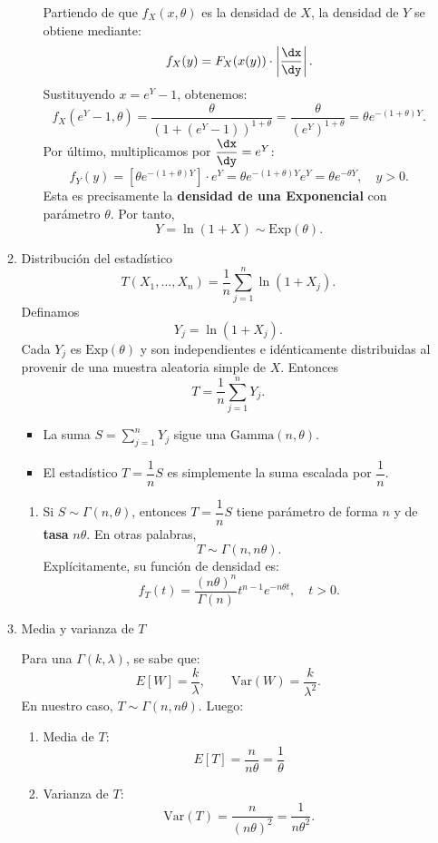 \begin{enumerate}[label=\color{red}\textbf{\arabic*)}]
\begin{enumerate}[label=\arabic*)]
\begin{enumerate}[label=\arabic*)]
        Partiendo de que $f_X(x,\theta)$ es la densidad de $X$, la densidad de  $Y$ se obtiene mediante: \[
        f_X(y)=F_X(x(y))\cdot \left| \dfrac{\dx }{\dy } \right| .
        \] 
        Sustituyendo $x=e^{Y} -1$, obtenemos: \[
        f_X(e^{Y}-1,\theta )=\dfrac{\theta}{(1+(e^{Y} -1))^{1+\theta}}=\dfrac{\theta}{(e^{Y})^{1+\theta} }=\theta e^{-(1+\theta)Y}. 
        \] 
        Por último, multiplicamos por $\dfrac{\dx }{\dy }=e^{Y} $: \[
        f_Y(y)=\left[ \theta e^{-(1+\theta)Y}  \right] \cdot e^{Y}=\theta e^{-(1+\theta)Y} e^{Y}=\theta e^{-\theta Y}, \quad y>0.
        \] 
        Esta es precisamente la \textbf{densidad de una Exponencial} con parámetro $\theta$. Por tanto, \[
        Y=\ln(1+X)\sim \mathrm{Exp}(\theta).
        \] 
        \end{enumerate}
    \item Distribución del estadístico
        \[
        T(X_1,\dots,X_n)=\dfrac{1}{n}\sum_{j=1}^{n} \ln(1+X_j).
        \] 
        Definamos \[
        Y_j=\ln(1+X_j).
        \] 
        Cada $Y_j$ es  $\mathrm{Exp}(\theta)$ y son independientes e idénticamente distribuidas al provenir de una muestra aleatoria simple de $X$. Entonces  \[
        T=\dfrac{1}{n}\sum_{j=1}^{n} Y_j.
        \] 
        \begin{itemize}[label=\textbullet]
            \item La suma $S=\sum_{j=1}^{n} Y_j$ sigue una $\mathrm{Gamma}(n,\theta)$.
            \item El estadístico $T=\dfrac{1}{n}S$ es simplemente la suma escalada por $\dfrac{1}{n}$.
        \end{itemize}
        \begin{enumerate}[label=\arabic*), leftmargin=*]
            \item Si $S\sim \Gamma(n,\theta )$, entonces $T=\dfrac{1}{n}S$ tiene parámetro de forma $n$ y de \textbf{tasa} $n\theta$. En otras palabras, \[
            T\sim \Gamma(n, n\theta).
            \]  
            Explícitamente, su función de densidad es: \[
            f_T(t)=\dfrac{(n\theta)^n}{\Gamma(n)}t^{n-1}e^{-n\theta t},\quad t>0. 
            \] 
        \end{enumerate}
    \item Media y varianza de $T$

        Para una  $\Gamma(k,\lambda)$, se sabe que: \[
            E[W]=\dfrac{k}{\lambda},\qquad \mathrm{Var}(W)=\dfrac{k}{\lambda^2}.
        \] 
        En nuestro caso, $T\sim \Gamma(n,n\theta)$. Luego: 
        \begin{enumerate}[label=\arabic*)]
            \item Media de $T$:  \[
                    E[T]=\dfrac{n}{n\theta}=\dfrac{1}{\theta}
            \] 
        \item Varianza de $T$:  \[
        \mathrm{Var}(T)=\dfrac{n}{(n\theta)^2}=\dfrac{1}{n\theta^2}.
        \] 
        \end{enumerate}
\end{enumerate}


\end{enumerate}
